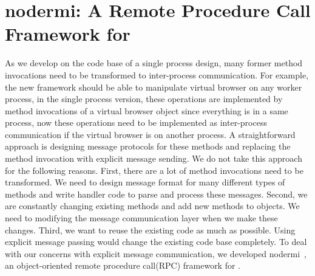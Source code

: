 \chapter{nodermi: A Remote Procedure Call Framework for \nodejs{}}
\label{ch:rmi}

As we develop \cbtwo on the code base of a single process design,
many former method invocations need to be transformed to inter-process
communication.
For example, the new framework should be able to manipulate
virtual browser on any worker process, 
in the single process version, 
these operations are implemented by method invocations of a virtual browser
object since everything is in a same process,
now these operations need to be implemented as inter-process
communication if the virtual browser is on another process.
A straightforward approach is
designing message protocols for these methods and
replacing the method invocation with explicit message sending.
We do not take this approach for the following reasons.
First, there are a lot of method invocations need to be transformed.
We need to design message format for many different types of methods and
write handler code to parse and process these messages.
Second, we are constantly changing existing methods and add
new methods to objects.
We need to modifying the message communication layer 
when we make these changes.
Third, 
we want to reuse the existing code as much as possible.
Using explicit message passing would change the existing code base completely.
To deal with our concerns with explicit message communication,
we developed nodermi~\cite{nodermi}, an object-oriented
remote procedure call(RPC) framework for \nodejs{}.

